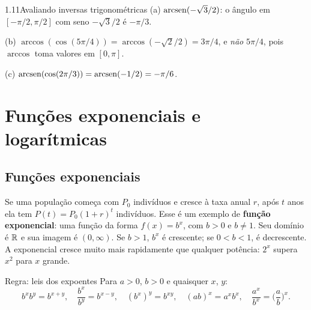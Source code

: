 \begin{exemplo}{1.11}{Avaliando inversas trigonométricas}
(a) $\operatorname{arcsen}(-\sqrt3/2)$: o ângulo em $[-\pi/2,\pi/2]$ com seno $-\sqrt3/2$ é $-\pi/3$.

(b) $\arccos(\cos(5\pi/4))=\arccos(-\sqrt2/2)=3\pi/4$, e \emph{não} $5\pi/4$, pois
$\arccos$ toma valores em $[0,\pi]$.

(c) $\operatorname{arcsen}(\cos(2\pi/3))=\operatorname{arcsen}(-1/2)=-\pi/6$.
\end{exemplo}

\section{Funções exponenciais e logarítmicas}

\subsection{Funções exponenciais}

Se uma população começa com $P_0$ indivíduos e cresce à taxa anual $r$, após $t$ anos ela
tem $P(t)=P_0(1+r)^t$ indivíduos. Esse é um exemplo de \textbf{função exponencial}: uma
função da forma $f(x)=b^x$, com $b>0$ e $b\neq1$. Seu domínio é $\mathbb{R}$ e sua imagem é
$(0,\infty)$. Se $b>1$, $b^x$ é crescente; se $0<b<1$, é decrescente. A exponencial
cresce muito mais rapidamente que qualquer potência: $2^x$ supera $x^2$ para $x$ grande.


\begin{regra}{Regra: leis dos expoentes}
Para $a>0$, $b>0$ e quaisquer $x$, $y$:
\[
b^xb^y=b^{x+y},\quad \frac{b^x}{b^y}=b^{x-y},\quad (b^x)^y=b^{xy},\quad
(ab)^x=a^xb^x,\quad \frac{a^x}{b^x}=\Big(\frac ab\Big)^x.
\]
\end{regra}

